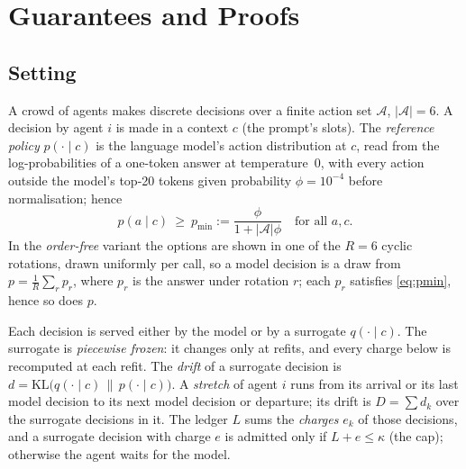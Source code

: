 \section{Guarantees and Proofs}\label{app:theory}

\subsection{Setting}
A crowd of agents makes discrete decisions over a finite action set $\mathcal{A}$, $|\mathcal{A}|=6$.
A decision by agent $i$ is made in a context $c$ (the prompt's slots). The \emph{reference policy}
$p(\cdot\mid c)$ is the language model's action distribution at $c$, read from the log-probabilities
of a one-token answer at temperature~0, with every action outside the model's top-20 tokens given
probability $\phi=10^{-4}$ before normalisation; hence
\begin{equation}
  p(a\mid c)\ \ge\ p_{\min} := \frac{\phi}{1+|\mathcal{A}|\phi}\quad\text{for all } a, c. \label{eq:pmin}
\end{equation}
In the \emph{order-free} variant the options are shown in one of the $R=6$ cyclic rotations, drawn
uniformly per call, so a model decision is a draw from $p=\frac1R\sum_{r} p_r$, where $p_r$ is the
answer under rotation $r$; each $p_r$ satisfies \eqref{eq:pmin}, hence so does $p$.

Each decision is served either by the model or by a surrogate $q(\cdot\mid c)$. The surrogate is
\emph{piecewise frozen}: it changes only at refits, and every charge below is recomputed at each refit.
The \emph{drift} of a surrogate decision is $d=\mathrm{KL}\big(q(\cdot\mid c)\,\|\,p(\cdot\mid c)\big)$.
A \emph{stretch} of agent $i$ runs from its arrival or its last model decision to its next model
decision or departure; its drift is $D=\sum d_k$ over the surrogate decisions in it. The ledger $L$
sums the \emph{charges} $e_k$ of those decisions, and a surrogate decision with charge $e$ is admitted
only if $L+e\le \kappa$ (the cap); otherwise the agent waits for the model.

